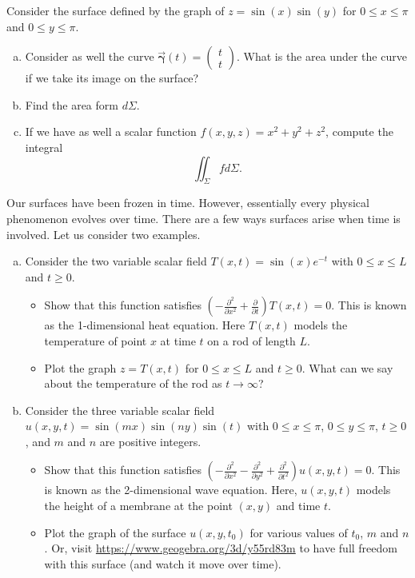\documentclass[12pt]{article} %
\newcommand{\curvegamma}{\boldsymbol{\vec{\gamma}}}
\begin{document}
\begin{problem}
    Consider the surface defined by the graph of $z=\sin(x)\sin(y)$ for $0\leq x \leq \pi$ and $0\leq y\leq \pi$. 
    \begin{enumerate}[(a)]
        \item Consider as well the curve $\curvegamma(t) = \begin{pmatrix} t \\ t \end{pmatrix}$.  What is the area under the curve if we take its image on the surface?
        \item Find the area form $d\Sigma$.
        \item If we have as well a scalar function $f(x,y,z)=x^2+y^2+z^2$, compute the integral
        \[
        \iint_\Sigma f d\Sigma.
        \]
    \end{enumerate}
\end{problem}

\begin{problem}
    Our surfaces have been frozen in time.  However, essentially every physical phenomenon evolves over time.  There are a few ways surfaces arise when time is involved.  Let us consider two examples.
    \begin{enumerate}[(a)]
        \item Consider the two variable scalar field $T(x,t) = \sin(x)e^{-t}$ with $0\leq x \leq L$ and $t\geq 0$. 
        \begin{itemize}
            \item Show that this function satisfies $\left(-\frac{\partial^2}{\partial x^2} + \frac{\partial}{\partial t}\right) T(x,t)=0$. This is known as the 1-dimensional heat equation. Here $T(x,t)$ models the temperature of point $x$ at time $t$ on a rod of length $L$.
            \item Plot the graph $z=T(x,t)$ for $0\leq x \leq L$ and $t\geq 0$.  What can we say about the temperature of the rod as $t\to \infty$?
        \end{itemize}
        \item Consider the three variable scalar field $u(x,y,t) = \sin(mx)\sin(ny)\sin(t)$ with $0\leq x \leq \pi$, $0\leq y \leq \pi$, $t\geq 0$, and $m$ and $n$ are positive integers.
        \begin{itemize}
            \item Show that this function satisfies $\left(-\frac{\partial^2}{\partial x^2}-\frac{\partial^2}{\partial y^2} + \frac{\partial^2}{\partial t^2}\right)u(x,y,t) = 0.$ This is known as the 2-dimensional wave equation. Here, $u(x,y,t)$ models the height of a membrane at the point $(x,y)$ and time $t$.
            \item Plot the graph of the surface $u(x,y,t_0)$ for various values of $t_0$, $m$ and $n$.  Or, visit \url{https://www.geogebra.org/3d/y55rd83m} to have full freedom with this surface (and watch it move over time).
        \end{itemize}
    \end{enumerate}
\end{problem}
\end{document}
